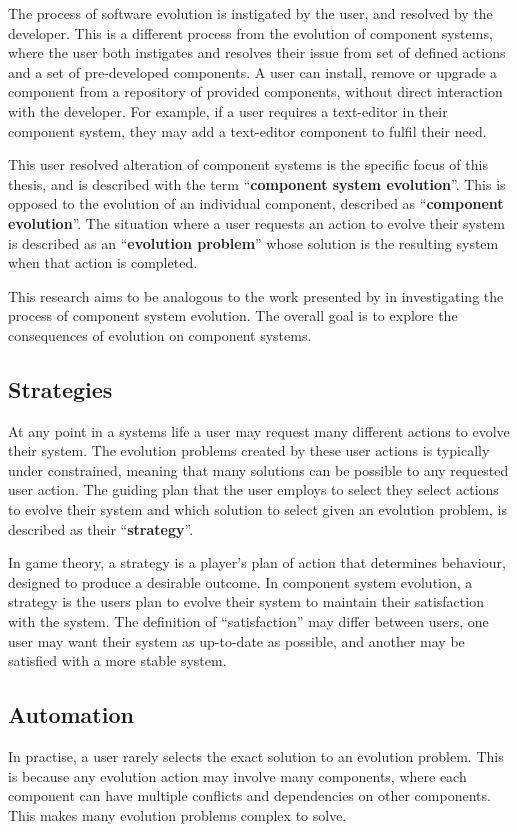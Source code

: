 The process of software evolution is instigated by the user, and resolved by the developer.
This is a different process from the evolution of component systems, 
where the user both instigates and resolves their issue from set of defined actions and a set of pre-developed components.
A user can install, remove or upgrade a component from a repository of provided components, without direct interaction with the developer. 
For example, if a user requires a text-editor in their component system, they may add a text-editor component to fulfil their need.

This user resolved alteration of component systems is the specific focus of this thesis, and is described with the term ``\textbf{component system evolution}''.
This is opposed to the evolution of an individual component, described as ``\textbf{component evolution}''.
The situation where a user requests an action to evolve their system is described as an ``\textbf{evolution problem}'' whose solution is the resulting system when that action is completed.

This research aims to be analogous to the work presented by \cite{lehman1980} in investigating the process of component system evolution.
The overall goal is to explore the consequences of evolution on component systems.

\subsection{Strategies}
At any point in a systems life a user may request many different actions to evolve their system.
The evolution problems created by these user actions is typically under constrained, meaning that many solutions can be possible to any requested user action.
The guiding plan that the user employs to select they select actions to evolve their system and which solution to select given an evolution problem, is described as their ``\textbf{strategy}''.

In game theory, a strategy is a player's plan of action that determines behaviour, designed to produce a desirable outcome.
In component system evolution, a strategy is the users plan to evolve their system to maintain their satisfaction with the system.
The definition of ``satisfaction'' may differ between users, one user may want their system as up-to-date as possible, 
and another may be satisfied with a more stable system.

\subsection{Automation}
In practise, a user rarely selects the exact solution to an evolution problem.
This is because any evolution action may involve many components, 
where each component can have multiple conflicts and dependencies on other components.
This makes many evolution problems complex to solve.

